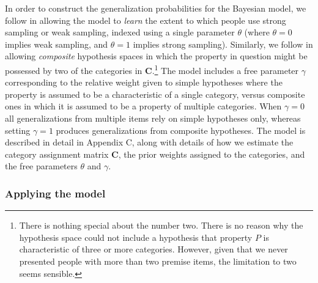 In order to construct the generalization probabilities for the Bayesian model, we follow  in allowing the model to {\it learn} the extent to which people use strong sampling or weak sampling, indexed using a single parameter $\theta$ (where $\theta=0$ implies weak sampling, and $\theta = 1$ implies strong sampling). Similarly, we follow  in allowing {\it composite} hypothesis spaces in which the property in question might be possessed by two of the categories in $\mathbf{C}$.\footnote{There is nothing special about the number two. There is no reason why the hypothesis space could not include a hypothesis that property $P$ is characteristic of three or more categories. However, given that we never presented people with more than two premise items, the limitation to two seems sensible.} The model includes a free parameter $\gamma$ corresponding to the relative weight given to simple hypotheses where the property is assumed to be a characteristic of a single category, versus composite ones in which it is assumed to be a property of multiple categories. When $\gamma = 0$ all generalizations from multiple items rely on simple hypotheses only, whereas setting $\gamma = 1$ produces generalizations from composite hypotheses. The model is described in detail in Appendix C, along with details of how we estimate the category assignment matrix $\mathbf{C}$, the prior weights assigned to the categories, and the free parameters $\theta$ and $\gamma$.



\bigskip
\subsubsection*{Applying the model}

%
%
%



